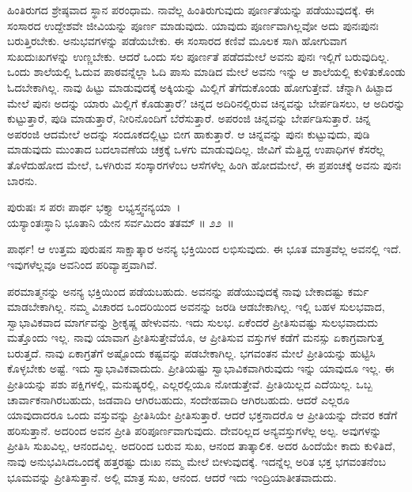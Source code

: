 ಹಿಂತಿರುಗದ ಶ್ರೇಷ್ಠವಾದ ಸ್ಥಾನ ಪರಂಧಾಮ. ನಾವೆಲ್ಲ ಹಿಂತಿರುಗುವುದು ಪೂರ್ಣತೆಯನ್ನು ಪಡೆಯುವುದಕ್ಕೆ. ಈ ಸಂಸಾರದ ಉದ್ದೇಶವೇ ಜೀವಿಯನ್ನು ಪೂರ್ಣ ಮಾಡುವುದು. ಯಾವುದು ಪೂರ್ಣವಾಗಿಲ್ಲವೋ ಅದು ಪುನಃಪುನಃ ಬರುತ್ತಿರಬೇಕು. ಅನುಭವಗಳನ್ನು ಪಡೆಯಬೇಕು. ಈ ಸಂಸಾರದ ಕಣಿವೆ ಮೂಲಕ ಸಾಗಿ ಹೋಗುವಾಗ ಸುಖದುಃಖಗಳನ್ನು ಉಣ್ಣಬೇಕು. ಆದರೆ ಒಂದು ಸಲ ಪೂರ್ಣತೆ ಪಡೆದಮೇಲೆ ಅವನು ಪುನಃ ಇಲ್ಲಿಗೆ ಬರುವುದಿಲ್ಲ. ಒಂದು ಶಾಲೆಯಲ್ಲಿ ಓದುವ ಪಾಠವನ್ನೆಲ್ಲಾ ಓದಿ ಪಾಸು ಮಾಡಿದ ಮೇಲೆ ಅವನು ಇನ್ನು ಆ ಶಾಲೆಯಲ್ಲಿ ಕುಳಿತುಕೊಂಡು ಓದಬೇಕಾಗಿಲ್ಲ. ನಾವು ಹಿಟ್ಟು ಮಾಡುವುದಕ್ಕೆ ಅಕ್ಕಿಯನ್ನು ಮಿಲ್ಲಿಗೆ ತೆಗೆದುಕೊಂಡು ಹೋಗುತ್ತೇವೆ. ಚೆನ್ನಾಗಿ ಹಿಟ್ಟಾದ ಮೇಲೆ ಪುನಃ ಅದನ್ನು ಯಾರು ಮಿಲ್ಲಿಗೆ ಕೊಡುತ್ತಾರೆ? ಚಿನ್ನದ ಅದಿರಿನಲ್ಲಿರುವ ಚಿನ್ನವನ್ನು ಬೇರ್ಪಡಿಸಲು, ಆ ಅದಿರನ್ನು ಕುಟ್ಟುತ್ತಾರೆ, ಪುಡಿ ಮಾಡುತ್ತಾರೆ, ನೀರಿನೊಂದಿಗೆ ಬೆರೆಸುತ್ತಾರೆ. ಅಪರಂಜಿ ಚಿನ್ನವನ್ನು ಬೇರ್ಪಡಿಸುತ್ತಾರೆ. ಚಿನ್ನ ಅಪರಂಜಿ ಆದಮೇಲೆ ಅದನ್ನು ಸಂದೂಕದಲ್ಲಿಟ್ಟು ಬೀಗ ಹಾಕುತ್ತಾರೆ. ಆ ಚಿನ್ನವನ್ನು ಪುನಃ ಕುಟ್ಟುವುದು, ಪುಡಿ ಮಾಡುವುದು ಮುಂತಾದ ಬದಲಾವಣೆಯ ಚಕ್ರಕ್ಕೆ ಒಳಗು ಮಾಡುವುದಿಲ್ಲ. ಜೀವಿಗೆ ಮೆತ್ತಿದ್ದ ಉಪಾಧಿಗಳ ಕೆಸರೆಲ್ಲ ತೊಳೆದುಹೋದ ಮೇಲೆ, ಒಳಗಿರುವ ಸಂಸ್ಕಾರಗಳೆಂಬ ಆಸೆಗಳೆಲ್ಲ ಹಿಂಗಿ ಹೋದಮೇಲೆ, ಈ ಪ್ರಪಂಚಕ್ಕೆ ಅವನು ಪುನಃ ಬಾರನು.

\begin{shloka}
ಪುರುಷಃ ಸ ಪರಃ ಪಾರ್ಥ ಭಕ್ತ್ಯಾ ಲಭ್ಯಸ್ತ್ವನನ್ಯಯಾ~।\\ಯಸ್ಯಾಂತಃಸ್ಥಾನಿ ಭೂತಾನಿ ಯೇನ ಸರ್ವಮಿದಂ ತತಮ್ \hfill॥ ೨೨~॥
\end{shloka}

\begin{artha}
ಪಾರ್ಥ! ಆ ಉತ್ತಮ ಪುರುಷನ ಸಾಕ್ಷಾತ್ಕಾರ ಅನನ್ಯ ಭಕ್ತಿಯಿಂದ ಲಭಿಸುವುದು. ಈ ಭೂತ ಮಾತ್ರವೆಲ್ಲ ಅವನಲ್ಲಿ ಇದೆ. ಇವುಗಳೆಲ್ಲವೂ ಅವನಿಂದ ಪರಿವ್ಯಾಪ್ತವಾಗಿವೆ.
\end{artha}

ಪರಮಾತ್ಮನನ್ನು ಅನನ್ಯ ಭಕ್ತಿಯಿಂದ ಪಡೆಯಬಹುದು. ಅವನನ್ನು ಪಡೆಯುವುದಕ್ಕೆ ನಾವು ಬೇಕಾದಷ್ಟು ಕರ್ಮ ಮಾಡಬೇಕಾಗಿಲ್ಲ. ನಮ್ಮ ವಿಚಾರದ ಒಂದರಿಯಿಂದ ಅವನನ್ನು ಜರಡಿ ಆಡಬೇಕಾಗಿಲ್ಲ. ಇಲ್ಲಿ ಬಹಳ ಸುಲಭವಾದ, ಸ್ವಾಭಾವಿಕವಾದ ಮಾರ್ಗವನ್ನು ಶ‍್ರೀಕೃಷ್ಣ ಹೇಳುವನು. ಇದು ಸುಲಭ. ಏಕೆಂದರೆ ಪ್ರೀತಿಸುವಷ್ಟು ಸುಲಭವಾದುದು ಮತ್ತೊಂದು ಇಲ್ಲ. ನಾವು ಯಾವಾಗ ಪ್ರೀತಿಸುತ್ತೇವೆಯೊ, ಆ ಪ್ರೀತಿಸುವ ವಸ್ತುಗಳ ಕಡೆಗೆ ಮನಸ್ಸು ಏಕಾಗ್ರವಾಗುತ್ತ ಬರುತ್ತದೆ. ನಾವು ಏಕಾಗ್ರತೆಗೆ ಅಷ್ಟೊಂದು ಕಷ್ಟವನ್ನು ಪಡಬೇಕಾಗಿಲ್ಲ. ಭಗವಂತನ ಮೇಲೆ ಪ್ರೀತಿಯನ್ನು ಹುಟ್ಟಿಸಿ ಕೊಳ್ಳಬೇಕು ಅಷ್ಟೆ. ಇದು ಸ್ವಾಭಾವಿಕವಾದುದು. ಪ್ರೀತಿಯಷ್ಟು ಸ್ವಾಭಾವಿಕವಾಗಿರುವುದು ಇನ್ನು ಯಾವುದೂ ಇಲ್ಲ. ಈ ಪ್ರೀತಿಯನ್ನು ಪಶು ಪಕ್ಷಿಗಳಲ್ಲಿ, ಮನುಷ್ಯರಲ್ಲಿ, ಎಲ್ಲರಲ್ಲಿಯೂ ನೋಡುತ್ತೇವೆ. ಪ್ರೀತಿಯಿಲ್ಲದ ಎದೆಯಿಲ್ಲ. ಒಬ್ಬ ಚಾರ್ವಾಕನಾಗಿರಬಹುದು, ಜಡವಾದಿ ಆಗಿರಬಹುದು, ಸಂದೇಹವಾದಿ ಆಗಿರಬಹುದು. ಆದರೆ ಎಲ್ಲರೂ ಯಾವುದಾದರೂ ಒಂದು ವಸ್ತುವನ್ನು ಪ್ರೀತಿಸಿಯೇ ಪ್ರೀತಿಸುತ್ತಾರೆ. ಆದರೆ ಭಕ್ತನಾದರೊ ಆ ಪ್ರೀತಿಯನ್ನು ದೇವರ ಕಡೆಗೆ ಹರಿಸುತ್ತಾನೆ. ಅದರಿಂದ ಅವನ ಪ್ರೀತಿ ಪರಿಪೂರ್ಣವಾಗುವುದು. ದೇವರಿಲ್ಲದ ಅನ್ಯವಸ್ತುಗಳೆಲ್ಲ ಅಲ್ಪ. ಅವುಗಳನ್ನು ಪ್ರೀತಿಸಿ ಸುಖವಿಲ್ಲ, ಆನಂದವಿಲ್ಲ. ಅದರಿಂದ ಬರುವ ಸುಖ, ಆನಂದ ತಾತ್ಕಾಲಿಕ. ಅದರ ಹಿಂದೆಯೇ ಕಾದು ಕುಳಿತಿದೆ, ನಾವು ಅನುಭವಿಸಿದ\break ಒಂದಕ್ಕೆ ಹತ್ತರಷ್ಟು ದುಃಖ ನಮ್ಮ ಮೇಲೆ ಬೀಳುವುದಕ್ಕೆ. ಇದನ್ನೆಲ್ಲ ಅರಿತ ಭಕ್ತ ಭಗವಂತನೆಂಬ ಭೂಮವನ್ನು ಪ್ರೀತಿಸುತ್ತಾನೆ. ಅಲ್ಲಿ ಮಾತ್ರ ಸುಖ, ಆನಂದ. ಆದರೆ ಇದು ಇಂದ್ರಿಯಾತೀತವಾದುದು.

